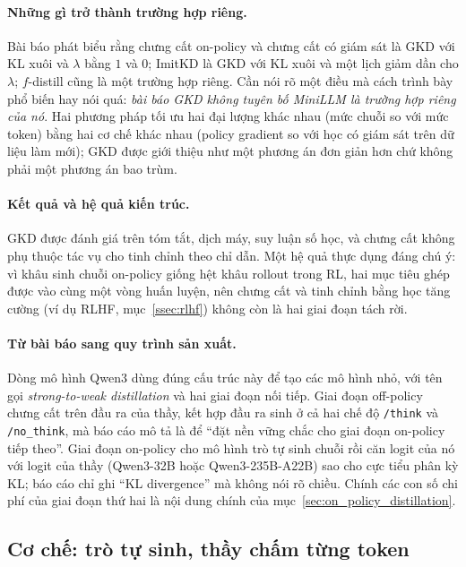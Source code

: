 \paragraph{Những gì trở thành trường hợp riêng.} Bài báo phát biểu rằng chưng cất on-policy và chưng cất có giám sát là GKD với KL xuôi và $\lambda$ bằng $1$ và $0$; ImitKD là GKD với KL xuôi và một lịch giảm dần cho $\lambda$; $f$-distill cũng là một trường hợp riêng. Cần nói rõ một điều mà cách trình bày phổ biến hay nói quá: \emph{bài báo GKD không tuyên bố MiniLLM là trường hợp riêng của nó}. Hai phương pháp tối ưu hai đại lượng khác nhau (mức chuỗi so với mức token) bằng hai cơ chế khác nhau (policy gradient so với học có giám sát trên dữ liệu làm mới); GKD được giới thiệu như một phương án đơn giản hơn chứ không phải một phương án bao trùm.

\paragraph{Kết quả và hệ quả kiến trúc.} GKD được đánh giá trên tóm tắt, dịch máy, suy luận số học, và chưng cất không phụ thuộc tác vụ cho tinh chỉnh theo chỉ dẫn. Một hệ quả thực dụng đáng chú ý: vì khâu sinh chuỗi on-policy giống hệt khâu rollout trong RL, hai mục tiêu ghép được vào cùng một vòng huấn luyện, nên chưng cất và tinh chỉnh bằng học tăng cường (ví dụ RLHF, mục~\ref{ssec:rlhf}) không còn là hai giai đoạn tách rời.

\paragraph{Từ bài báo sang quy trình sản xuất.} Dòng mô hình Qwen3 \cite{yang2025qwen3} dùng đúng cấu trúc này để tạo các mô hình nhỏ, với tên gọi \emph{strong-to-weak distillation} và hai giai đoạn nối tiếp. Giai đoạn off-policy chưng cất trên đầu ra của thầy, kết hợp đầu ra sinh ở cả hai chế độ \texttt{/think} và \texttt{/no\_think}, mà báo cáo mô tả là để ``đặt nền vững chắc cho giai đoạn on-policy tiếp theo''. Giai đoạn on-policy cho mô hình trò tự sinh chuỗi rồi căn logit của nó với logit của thầy (Qwen3-32B hoặc Qwen3-235B-A22B) sao cho cực tiểu phân kỳ KL; báo cáo chỉ ghi ``KL divergence'' mà không nói rõ chiều. Chính các con số chi phí của giai đoạn thứ hai là nội dung chính của mục~\ref{sec:on_policy_distillation}.

\subsection{Cơ chế: trò tự sinh, thầy chấm từng token}
\label{ssec:opd_mechanism}

